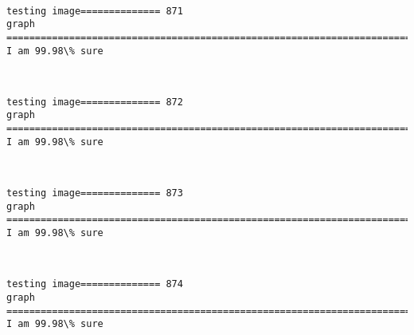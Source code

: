 \documentclass[11pt]{article}
\begin{document}
    \begin{center}
    \end{center}
    { \hspace*{\fill} \\}
    
    \begin{Verbatim}[commandchars=\\\{\}]
testing image============== 871
graph
============================================================================
I am 99.98\% sure

    \end{Verbatim}

    \begin{center}
    \end{center}
    { \hspace*{\fill} \\}
    
    \begin{Verbatim}[commandchars=\\\{\}]
testing image============== 872
graph
============================================================================
I am 99.98\% sure

    \end{Verbatim}

    \begin{center}
    \end{center}
    { \hspace*{\fill} \\}
    
    \begin{Verbatim}[commandchars=\\\{\}]
testing image============== 873
graph
============================================================================
I am 99.98\% sure

    \end{Verbatim}

    \begin{center}
    \end{center}
    { \hspace*{\fill} \\}
    
    \begin{Verbatim}[commandchars=\\\{\}]
testing image============== 874
graph
============================================================================
I am 99.98\% sure

    \end{Verbatim}
\end{document}
